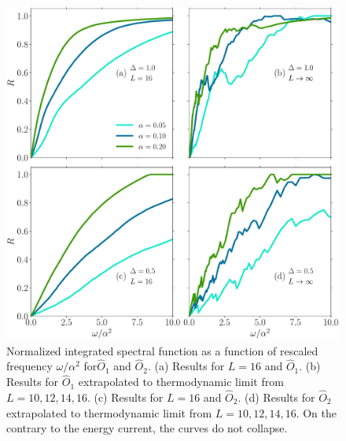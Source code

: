 \begin{figure}[ht]
  \centering
  \includegraphics[width=\figsize\textwidth]{Figures/O12_quadratic_scaling.pdf}
  \caption{Normalized integrated spectral function as a function of rescaled 
  frequency \(\omega/\alpha^2\) for\(\hat{O}_1\) and \(\hat{O}_2\).
  (a) Results for \(L=16\) and \(\hat{O}_1\).  (b) Results for \(\hat{O}_1\) extrapolated to
  thermodynamic limit from \(L=10,12,14,16\). (c) Results for \(L=16\) and \(\hat{O}_2\). 
  (d) Results for \(\hat{O}_2\) extrapolated to thermodynamic limit from \(L=10,12,14,16\).
  On the contrary to the energy current, the curves do not collapse.}\label{fig:O12 quadratic scaling}
\end{figure}
